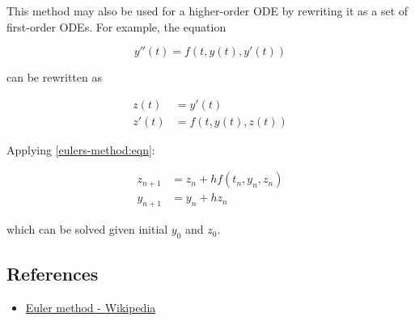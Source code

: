 This method may also be used for a higher-order ODE by rewriting it as
a set of first-order ODEs. For example, the equation

\begin{equation}
  y'' \left( t \right) = f \left( t, y \left( t \right), y'\left(t\right) \right)
\end{equation}

can be rewritten as

\begin{equation}
  \begin{aligned}
    z\left(t\right) &= y'\left(t\right) \\
    z'\left(t\right) &= f \left( t, y\left( t\right), z \left( t \right) \right)
  \end{aligned}
\end{equation}

Applying \ref{eulers-method:eqn}:

\begin{equation}
  \begin{aligned}
    z_{n+1} &= z_n + h f \left( t_n, y_n, z_n \right) \\
    y_{n+1} &= y_n + hz_n
  \end{aligned}
\end{equation}

which can be solved given initial \(y_0\) and \(z_0\).

\subsection*{References}

\begin{itemize}
\item
  \href{https://en.wikipedia.org/wiki/Euler\_method}{Euler method -
    Wikipedia}
\end{itemize}
